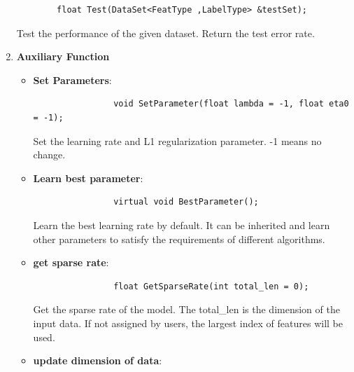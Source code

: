 \documentclass[11pt,a4paper]{article}
\newlength{\wideitemsep}
\let\olditem\item
\renewcommand{\item}{\setlength{\itemsep}{\wideitemsep}\olditem}
\begin{document}
\begin{enumerate}
        \lstset{language=C++,
            framexleftmargin=-1.5cm,
            xleftmargin=-1.5cm,
        }
        \begin{lstlisting}
        float Test(DataSet<FeatType ,LabelType> &testSet);
        \end{lstlisting}

        Test the performance of the given dataset. Return the test error rate.

    \item \textbf{Auxiliary Function}
        \lstset{language=C++,
            framexleftmargin=-2.8cm,
            xleftmargin=-2.8cm,
        }
        \begin{itemize}
            \item \textbf{Set Parameters}:

                \lstset{language=C++}
                \begin{lstlisting}
                void SetParameter(float lambda = -1, float eta0 = -1);
                \end{lstlisting}

                Set the learning rate and L1 regularization parameter. -1 means no change.

            \item \textbf{Learn best parameter}:

                \lstset{language=C++}
                \begin{lstlisting}
                virtual void BestParameter();
                \end{lstlisting}

                Learn the best learning rate by default. It can be inherited and learn other parameters to satisfy the requirements of different algorithms.

            \item \textbf{get sparse rate}:

                \lstset{language=C++}
                \begin{lstlisting}
                float GetSparseRate(int total_len = 0);
                \end{lstlisting}

                Get the sparse rate of the model. The total\_len is the dimension of the input data. If not assigned by users, the largest index of features will be used.

            \item \textbf{update dimension of data}:


\end{itemize}
\end{enumerate}
\end{document}
